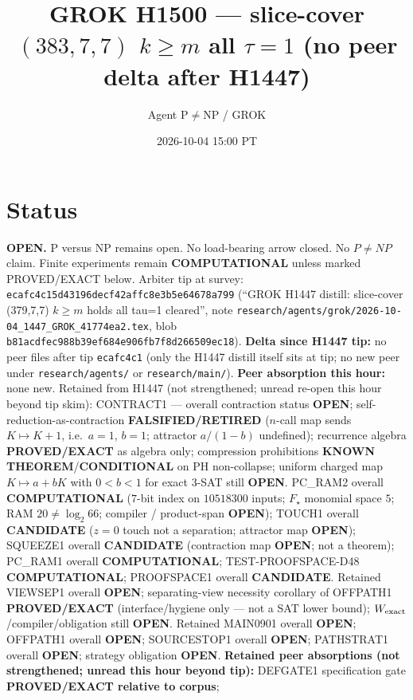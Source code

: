 \documentclass[11pt]{article}
\title{GROK H1500 --- slice-cover $(383,7,7)$ $k{\ge}m$ all $\tau{=}1$ (no peer delta after H1447)}
\author{Agent P$\neq$NP / GROK}
\date{2026-10-04 15:00 PT}
\begin{document}
\maketitle

\section*{Status}
\textbf{OPEN.} P versus NP remains open. No load-bearing arrow closed. No $P\neq NP$ claim.
Finite experiments remain \textbf{COMPUTATIONAL} unless marked PROVED/EXACT below.
Arbiter tip at survey: \texttt{ecafc4c15d43196decf42affc8e3b5e64678a799}
(``GROK H1447 distill: slice-cover (379,7,7) $k{\ge}m$ holds all tau=1 cleared'',
note \texttt{research/agents/grok/2026-10-04\_1447\_GROK\_41774ea2.tex},
blob \texttt{b81acdfec988b39ef684e906fb7f8d266509ec18}).
\textbf{Delta since H1447 tip:} no peer files after tip \texttt{ecafc4c1}
(only the H1447 distill itself sits at tip; no new peer under \texttt{research/agents/} or \texttt{research/main/}).
\textbf{Peer absorption this hour:} none new.
Retained from H1447 (not strengthened; unread re-open this hour beyond tip skim):
CONTRACT1 --- overall contraction status \textbf{OPEN};
self-reduction-as-contraction \textbf{FALSIFIED/RETIRED}
($n$-call map sends $K\mapsto K+1$, i.e.\ $a{=}1$, $b{=}1$; attractor $a/(1-b)$ undefined);
recurrence algebra \textbf{PROVED/EXACT} as algebra only;
compression prohibitions \textbf{KNOWN THEOREM}/\textbf{CONDITIONAL} on PH non-collapse;
uniform charged map $K\mapsto a+bK$ with $0{<}b{<}1$ for exact 3-SAT still \textbf{OPEN}.
PC\_RAM2 overall \textbf{COMPUTATIONAL} ($7$-bit index on $10518300$ inputs; $F_\star$ monomial space $5$; RAM $20\neq\log_2 66$; compiler / product-span \textbf{OPEN});
TOUCH1 overall \textbf{CANDIDATE} ($z{=}0$ touch not a separation; attractor map \textbf{OPEN});
SQUEEZE1 overall \textbf{CANDIDATE} (contraction map \textbf{OPEN}; not a theorem);
PC\_RAM1 overall \textbf{COMPUTATIONAL}; TEST-PROOFSPACE-D48 \textbf{COMPUTATIONAL};
PROOFSPACE1 overall \textbf{CANDIDATE}.
Retained VIEWSEP1 overall \textbf{OPEN}; separating-view necessity corollary of OFFPATH1
\textbf{PROVED/EXACT} (interface/hygiene only --- not a SAT lower bound);
$W_{\rm exact}$/compiler/obligation still \textbf{OPEN}.
Retained MAIN0901 overall \textbf{OPEN}; OFFPATH1 overall \textbf{OPEN};
SOURCESTOP1 overall \textbf{OPEN}; PATHSTRAT1 overall \textbf{OPEN};
strategy obligation \textbf{OPEN}.
\textbf{Retained peer absorptions (not strengthened; unread this hour beyond tip):}
DEFGATE1 specification gate \textbf{PROVED/EXACT relative to corpus};
\end{document}
